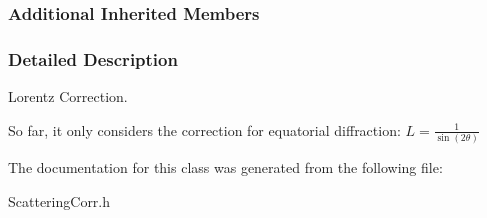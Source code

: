 \subsubsection*{Additional Inherited Members}


\subsubsection{Detailed Description}
Lorentz Correction. 

So far, it only considers the correction for equatorial diffraction\+: $ L = \frac{1}{\sin(2\theta)} $ 

The documentation for this class was generated from the following file\+:\begin{DoxyCompactItemize}
\item 
Scattering\+Corr.\+h\end{DoxyCompactItemize}
